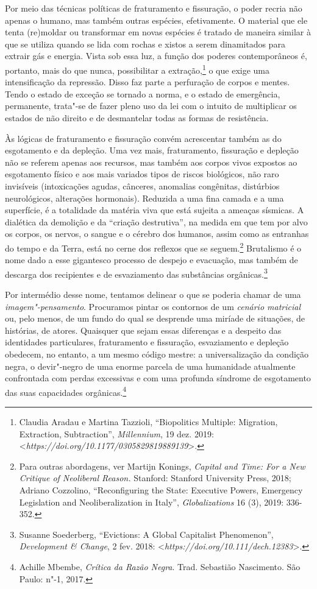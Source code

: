 \begin{multicols}{2}
Por meio das técnicas políticas de fraturamento e fissuração, o poder
recria não apenas o humano, mas também outras espécies, efetivamente. O
material que ele tenta (re)moldar ou transformar em novas espécies é
tratado de maneira similar à que se utiliza quando se lida com rochas e
xistos a serem dinamitados para extrair gás e energia. Vista sob essa
luz, a função dos poderes contemporâneos é, portanto, mais do que nunca,
possibilitar a extração,\footnote{Claudia Aradau e Martina Tazzioli,
  ``Biopolitics Multiple: Migration, Extraction, Subtraction'',
  \textit{Millennium}, 19 dez. 2019:
  \textless{}\textit{https://doi.org/10.1177/0305829819889139}\textgreater{}.}
o que exige uma intensificação da repressão. Disso faz parte a
perfuração de corpos e mentes. Tendo o estado de exceção se tornado a
norma, e o estado de emergência, permanente, trata"-se de fazer pleno uso
da lei com o intuito de multiplicar os estados de não direito e de
desmantelar todas as formas de resistência.

Às lógicas de fraturamento e fissuração convém acrescentar também as do
esgotamento e da depleção. Uma vez mais, fraturamento, fissuração e
depleção não se referem apenas aos recursos, mas também aos corpos vivos
expostos ao esgotamento físico e aos mais variados tipos de riscos
biológicos, não raro invisíveis (intoxicações agudas, cânceres,
anomalias congênitas, distúrbios neurológicos, alterações hormonais).
Reduzida a uma fina camada e a uma superfície, é a totalidade da matéria
viva que está sujeita a ameaças sísmicas. A dialética da demolição e da
``criação destrutiva'', na medida em que tem por alvo os corpos, os
nervos, o sangue e o cérebro dos humanos, assim como as entranhas do
tempo e da Terra, está no cerne dos reflexos que se seguem.\footnote{Para
  outras abordagens, ver Martijn Konings, \textit{Capital and Time: For a
  New Critique of Neoliberal Reason.} Stanford: Stanford University
  Press, 2018; Adriano Cozzolino, ``Reconfiguring the State: Executive
  Powers, Emergency Legislation and Neoliberalization in Italy'',
  \textit{Globalizations} 16 (3), 2019: 336-352.} Brutalismo é o nome dado
a esse gigantesco processo de despejo e evacuação, mas também de
descarga dos recipientes e de esvaziamento das substâncias
orgânicas.\footnote{Susanne Soederberg, ``Evictions: A Global Capitalist
  Phenomenon'', \textit{Development \& Change}, 2 fev. 2018:
  \textless{}\textit{https://doi.org/10.111/dech.12383}\textgreater{}.}

Por intermédio desse nome, tentamos delinear o que se poderia chamar de
uma \textit{imagem"-pensamento}. Procuramos pintar os contornos de um
\textit{cenário matricial} ou, pelo menos, de um fundo do qual se
desprende uma miríade de situações, de histórias, de atores. Quaisquer
que sejam essas diferenças e a despeito das identidades particulares,
fraturamento e fissuração, esvaziamento e depleção obedecem, no entanto,
a um mesmo código mestre: a universalização da condição negra, o
devir"-negro de uma enorme parcela de uma humanidade atualmente
confrontada com perdas excessivas e com uma profunda síndrome de
esgotamento das suas capacidades orgânicas.\footnote{Achille Mbembe,
  \textit{Crítica da Razão Negra}. Trad. Sebastião Nascimento. São Paulo:
  n"-1, 2017.}


\end{multicols}
